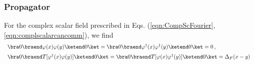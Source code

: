 \bigskip

\subsubsection{Propagator}
For the complex scalar field prescribed in Eqs. (\ref{eqn:CompScFourier}, \ref{eqn:complscalarcancomm}),
we find 
\begin{eqnarray}
\begin{array}{l}
\bra 0 \braend \varphi(x) \varphi(y) \ketend 0 \ket = 
\bra 0 \braend \varphi^\dagger(x) \varphi^\dagger(y) \ketend 0 \ket = 0\,,
\vspace{2mm}
\\
\bra 0 \braend T[\varphi^\dagger(x) \varphi(y)] \ketend 0 \ket 
= 
\bra 0 \braend T[\varphi(x) \varphi^\dagger(y)] \ketend 0 \ket 
= 
\Delta_F(x-y)
\end{array}
\label{eqn:CplxScProp}
\end{eqnarray}





